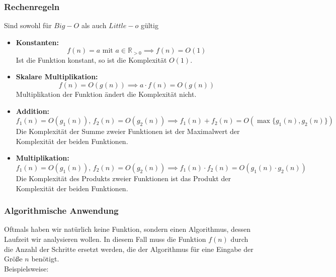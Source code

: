 \documentclass[
../AuD-Zusammenfassung.tex,
]
{subfiles}
\begin{document}
\subsubsection{Rechenregeln}
Sind sowohl für $Big-O$ als auch $Little-o$ gültig
\begin{itemize}
    \item \textbf{Konstanten:} \\
    \[
    f(n) = a \text{ mit } a \in \mathbb{R}_{>0} \implies f(n) = O(1)
    \]
    Ist die Funktion konstant, so ist die Komplexität \(O(1)\).

    \item \textbf{Skalare Multiplikation:} \\
    \[
    f(n) = O(g(n)) \implies a \cdot f(n) = O(g(n))
    \]
    Multiplikation der Funktion ändert die Komplexität nicht.

    \item \textbf{Addition:} \\
    \[
    f_1(n) = O(g_1(n)), \, f_2(n) = O(g_2(n)) \implies f_1(n) + f_2(n) = O(\max\{g_1(n), g_2(n)\})
    \]
    Die Komplexität der Summe zweier Funktionen ist der Maximalwert der Komplexität der beiden Funktionen.

    \item \textbf{Multiplikation:} \\
    \[
    f_1(n) = O(g_1(n)), \, f_2(n) = O(g_2(n)) \implies f_1(n) \cdot f_2(n) = O(g_1(n) \cdot g_2(n))
    \]
    Die Komplexität des Produkts zweier Funktionen ist das Produkt der Komplexität der beiden Funktionen.
\end{itemize}

\subsubsection{Algorithmische Anwendung}
Oftmals haben wir natürlich keine Funktion, sondern einen Algorithmus, dessen Laufzeit wir analysieren wollen. In diesem Fall muss die Funktion $f(n)$ durch die Anzahl der Schritte ersetzt werden, die der Algorithmus für eine Eingabe der Größe $n$ benötigt. \\
Beispielsweise:

\begin{algorithm}[H]
\end{algorithm}
\end{document}
